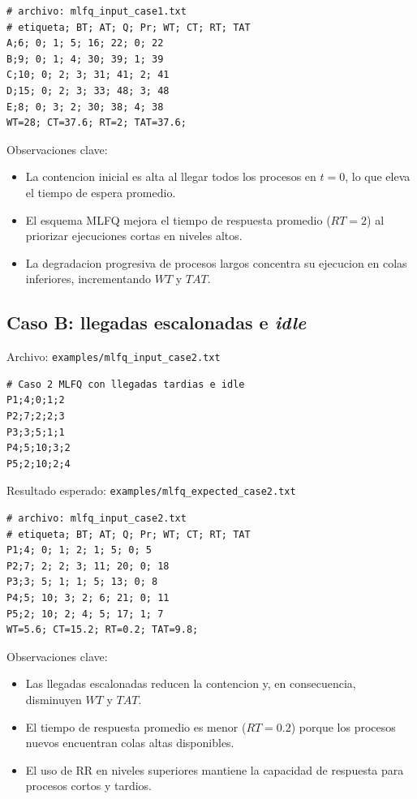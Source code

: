 \documentclass[12pt,a4paper]{article}
\begin{document}
\begin{lstlisting}[style=plainstyle]
# archivo: mlfq_input_case1.txt
# etiqueta; BT; AT; Q; Pr; WT; CT; RT; TAT
A;6; 0; 1; 5; 16; 22; 0; 22
B;9; 0; 1; 4; 30; 39; 1; 39
C;10; 0; 2; 3; 31; 41; 2; 41
D;15; 0; 2; 3; 33; 48; 3; 48
E;8; 0; 3; 2; 30; 38; 4; 38
WT=28; CT=37.6; RT=2; TAT=37.6;
\end{lstlisting}

Observaciones clave:
\begin{itemize}[leftmargin=1.5cm]
    \item La contencion inicial es alta al llegar todos los procesos en \(t=0\), lo que eleva el tiempo de espera promedio.
    \item El esquema MLFQ mejora el tiempo de respuesta promedio (\(RT=2\)) al priorizar ejecuciones cortas en niveles altos.
    \item La degradacion progresiva de procesos largos concentra su ejecucion en colas inferiores, incrementando \(WT\) y \(TAT\).
\end{itemize}

\subsection{Caso B: llegadas escalonadas e \textit{idle}}

Archivo: \texttt{examples/mlfq\_input\_case2.txt}

\begin{lstlisting}[style=plainstyle]
# Caso 2 MLFQ con llegadas tardias e idle
P1;4;0;1;2
P2;7;2;2;3
P3;3;5;1;1
P4;5;10;3;2
P5;2;10;2;4
\end{lstlisting}

Resultado esperado: \texttt{examples/mlfq\_expected\_case2.txt}

\begin{lstlisting}[style=plainstyle]
# archivo: mlfq_input_case2.txt
# etiqueta; BT; AT; Q; Pr; WT; CT; RT; TAT
P1;4; 0; 1; 2; 1; 5; 0; 5
P2;7; 2; 2; 3; 11; 20; 0; 18
P3;3; 5; 1; 1; 5; 13; 0; 8
P4;5; 10; 3; 2; 6; 21; 0; 11
P5;2; 10; 2; 4; 5; 17; 1; 7
WT=5.6; CT=15.2; RT=0.2; TAT=9.8;
\end{lstlisting}

Observaciones clave:
\begin{itemize}[leftmargin=1.5cm]
    \item Las llegadas escalonadas reducen la contencion y, en consecuencia, disminuyen \(WT\) y \(TAT\).
    \item El tiempo de respuesta promedio es menor (\(RT=0.2\)) porque los procesos nuevos encuentran colas altas disponibles.
    \item El uso de RR en niveles superiores mantiene la capacidad de respuesta para procesos cortos y tardios.
\end{itemize}
\end{document}
